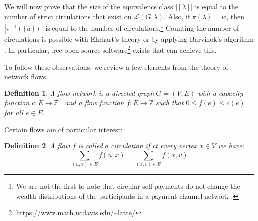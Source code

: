 \documentclass[10pt,twocolumn]{article}
\newtheorem{definition}{Definition}[section]
\begin{document}
We will now prove that the size of the equivalence class \( |[\lambda]| \) is equal to the number of strict circulations that exist on \( \mathcal{L}(G, \lambda) \).  
Also, if \( \pi(\lambda) = w \), then \( |\pi^{-1}(\{w\})| \) is equal to the number of circulations.\footnote{We are not the first to note that circular self-payments do not change the wealth distributions of the participants in a payment channel network \cite{piatkivskyi2018rebalancing}.}  
Counting the number of circulations is possible with Ehrhart's theory \cite{ehrhart1962polyhedra} or by applying Barvinok's algorithm \cite{barvinok1994polynomial}.  
In particular, free open source software\footnote{\url{https://www.math.ucdavis.edu/~latte/}} exists \cite{de2004effective} that can achieve this.  

To follow these observations, we review a few elements from the theory of network flows.  

\begin{definition}
A flow network is a directed graph \( G = (V, E) \) with a capacity function \( c: E \rightarrow \mathbb{Z}^+ \) and a flow function \( f: E \rightarrow \mathbb{Z} \) such that \( 0 \leq f(e) \leq c(e) \) for all \( e \in E \).
\end{definition}

Certain flows are of particular interest:  

\begin{definition}
A flow \( f \) is called a circulation if at every vertex \( x \in V \) we have:
\begin{equation}
\sum_{(u,x) \in E} f(u,x) = \sum_{(x,v) \in E} f(x,v)
\end{equation}
\end{definition}



\end{document}
